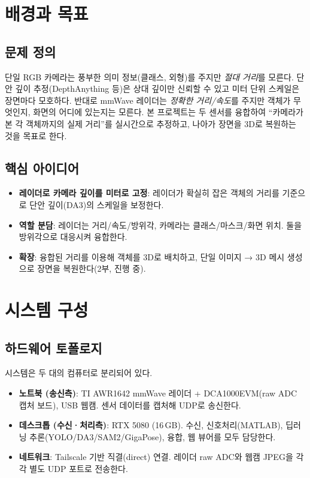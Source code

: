 \chapter{배경과 목표}

\section{문제 정의}
단일 RGB 카메라는 풍부한 의미 정보(클래스, 외형)를 주지만 \emph{절대 거리}를 모른다.
단안 깊이 추정(DepthAnything 등)은 상대 깊이만 신뢰할 수 있고 미터 단위 스케일은
장면마다 모호하다. 반대로 mmWave 레이더는 \emph{정확한 거리/속도}를 주지만 객체가
무엇인지, 화면의 어디에 있는지는 모른다. 본 프로젝트는 두 센서를 융합하여
``카메라가 본 각 객체까지의 실제 거리''를 실시간으로 추정하고, 나아가 장면을
3D로 복원하는 것을 목표로 한다.

\section{핵심 아이디어}
\begin{itemize}
  \item \textbf{레이더로 카메라 깊이를 미터로 고정}: 레이더가 확실히 잡은 객체의
        거리를 기준으로 단안 깊이(DA3)의 스케일을 보정한다.
  \item \textbf{역할 분담}: 레이더는 거리/속도/방위각, 카메라는 클래스/마스크/화면 위치.
        둘을 방위각으로 대응시켜 융합한다.
  \item \textbf{확장}: 융합된 거리를 이용해 객체를 3D로 배치하고, 단일 이미지 → 3D
        메시 생성으로 장면을 복원한다(2부, 진행 중).
\end{itemize}

\chapter{시스템 구성}

\section{하드웨어 토폴로지}
시스템은 두 대의 컴퓨터로 분리되어 있다.
\begin{itemize}
  \item \textbf{노트북 (송신측)}: TI AWR1642 mmWave 레이더 + DCA1000EVM(raw ADC 캡처
        보드), USB 웹캠. 센서 데이터를 캡처해 UDP로 송신한다.
  \item \textbf{데스크톱 (수신·처리측)}: RTX 5080 (16\,GB). 수신, 신호처리(MATLAB),
        딥러닝 추론(YOLO/DA3/SAM2/GigaPose), 융합, 웹 뷰어를 모두 담당한다.
  \item \textbf{네트워크}: Tailscale 기반 직결(direct) 연결. 레이더 raw ADC와 웹캠
        JPEG을 각각 별도 UDP 포트로 전송한다.
\end{itemize}

